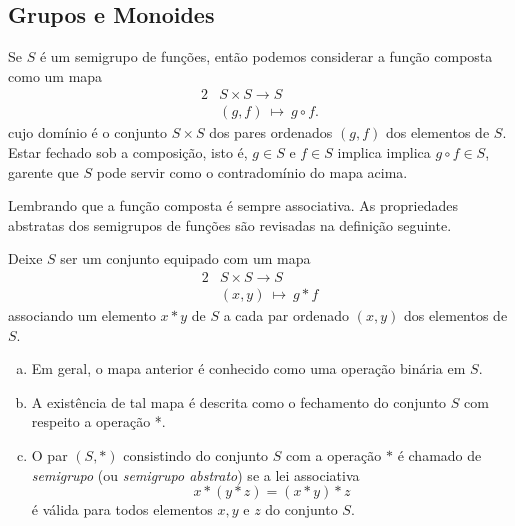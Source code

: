 \newpage

\subsection{Grupos e Monoides}
Se $S$ é um semigrupo de funções, então podemos considerar a função composta como um mapa
\begin{alignat}{2}
  &S \times S \to S \nonumber\\
  &\left(g,f\right)\ \mapsto\ g \circ f.
  \nonumber
\end{alignat}
cujo domínio é o conjunto $S \times S$ dos pares ordenados $(g,f)$ dos elementos de $S$. Estar fechado sob a composição, isto é, $g\in S$ e $f\in S$ implica implica $g\circ f \in S$, garente que $S$ pode servir como o contradomínio do mapa acima.

Lembrando que a função composta é sempre associativa. As propriedades abstratas dos semigrupos de funções são revisadas na definição seguinte.
\begin{definition}[Semigrupos]
  Deixe $S$ ser um conjunto equipado com um mapa
  \begin{alignat}{2}
    &S \times S \to S \nonumber\\
    &\left(x,y\right)\ \mapsto\ g * f
    \nonumber
  \end{alignat}
  associando um elemento $x* y$ de $S$ a cada par ordenado $\left(x,y\right)$ dos elementos de $S$.
  \begin{enumerate}[(a)]
    \item Em geral, o mapa anterior é conhecido como uma operação binária em $S$.
    \item A existência de tal mapa é descrita como o fechamento do conjunto $S$ com respeito a operação *.
    \item O par $\left(S,* \right)$ consistindo do conjunto $S$ com a operação $*$ é chamado de \emph{semigrupo} (ou \emph{semigrupo abstrato}) se a lei associativa $$x * (y * z) = (x * y) * z$$ é válida para todos elementos $x,y$ e $z$ do conjunto $S$.
  \end{enumerate}
\end{definition}

